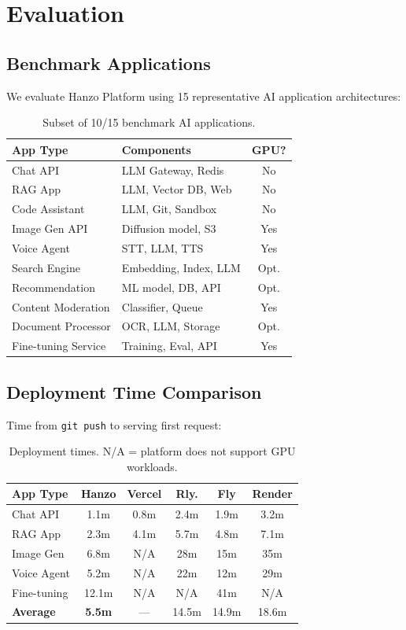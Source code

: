\documentclass[11pt,twocolumn]{article}
\begin{document}
\section{Evaluation}
\label{sec:evaluation}

\subsection{Benchmark Applications}

We evaluate Hanzo Platform using 15 representative AI application architectures:

\begin{table}[H]
\centering
\small
\begin{tabular}{llc}
\toprule
\textbf{App Type} & \textbf{Components} & \textbf{GPU?} \\
\midrule
Chat API & LLM Gateway, Redis & No \\
RAG App & LLM, Vector DB, Web & No \\
Code Assistant & LLM, Git, Sandbox & No \\
Image Gen API & Diffusion model, S3 & Yes \\
Voice Agent & STT, LLM, TTS & Yes \\
Search Engine & Embedding, Index, LLM & Opt. \\
Recommendation & ML model, DB, API & Opt. \\
Content Moderation & Classifier, Queue & Yes \\
Document Processor & OCR, LLM, Storage & Opt. \\
Fine-tuning Service & Training, Eval, API & Yes \\
\bottomrule
\end{tabular}
\caption{Subset of 10/15 benchmark AI applications.}
\label{tab:apps}
\end{table}

\subsection{Deployment Time Comparison}

Time from \texttt{git push} to serving first request:

\begin{table}[H]
\centering
\small
\begin{tabular}{lccccc}
\toprule
\textbf{App Type} & \textbf{Hanzo} & \textbf{Vercel} & \textbf{Rly.} & \textbf{Fly} & \textbf{Render} \\
\midrule
Chat API & 1.1m & 0.8m & 2.4m & 1.9m & 3.2m \\
RAG App & 2.3m & 4.1m & 5.7m & 4.8m & 7.1m \\
Image Gen & 6.8m & N/A & 28m & 15m & 35m \\
Voice Agent & 5.2m & N/A & 22m & 12m & 29m \\
Fine-tuning & 12.1m & N/A & N/A & 41m & N/A \\
\midrule
\textbf{Average} & \textbf{5.5m} & --- & 14.5m & 14.9m & 18.6m \\
\bottomrule
\end{tabular}
\caption{Deployment times. N/A = platform does not support GPU workloads.}
\label{tab:deploy_time}
\end{table}
\end{document}
